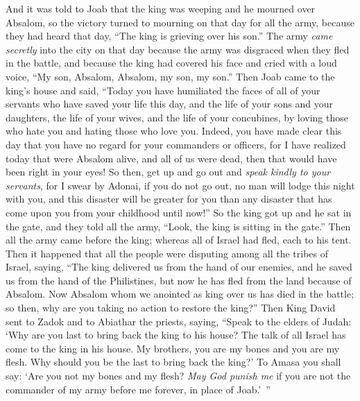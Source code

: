 \begin{biblechapter} %
 And it was told to Joab that the king was weeping and he mourned over Absalom,
\verse so the victory turned to mourning on that day for all the army, because they had heard that day, “The king is grieving over his son.”
\verse The army \textit{came secretly} into the city on that day because the army was disgraced when they fled in the battle,
\verse and because the king had covered his face and cried with a loud voice, “My son, Absalom, Absalom, my son, my son.”
\verse Then Joab came to the king’s house and said, “Today you have humiliated the faces of all of your servants who have saved your life this day, and the life of your sons and your daughters, the life of your wives, and the life of your concubines,
\verse by loving those who hate you and hating those who love you. Indeed, you have made clear this day that you have no regard for your commanders or officers, for I have realized today that were Absalom alive, and all of us were dead, then that would have been right in your eyes!
\verse So then, get up and go out and \textit{speak kindly to your servants}, for I swear by Adonai, if you do not go out, no man will lodge this night with you, and this disaster will be greater for you than any disaster that has come upon you from your childhood until now!”
\verse So the king got up and he sat in the gate, and they told all the army, “Look, the king is sitting in the gate.” Then all the army came before the king; whereas all of Israel had fled, each to his tent.
 Then it happened that all the people were disputing among all the tribes of Israel, saying, “The king delivered us from the hand of our enemies, and he saved us from the hand of the Philistines, but now he has fled from the land because of Absalom.
\verse Now Absalom whom we anointed as king over us has died in the battle; so then, why are you taking no action to restore the king?”
\verse Then King David sent to Zadok and to Abiathar the priests, saying, “Speak to the elders of Judah: ‘Why are you last to bring back the king to his house? The talk of all Israel has come to the king in his house.
\verse My brothers, you are my bones and you are my flesh. Why should you be the last to bring back the king?’
\verse To Amasa you shall say: ‘Are you not my bones and my flesh? \textit{May God punish me} if you are not the commander of my army before me forever, in place of Joab.’ ”

\end{biblechapter}
